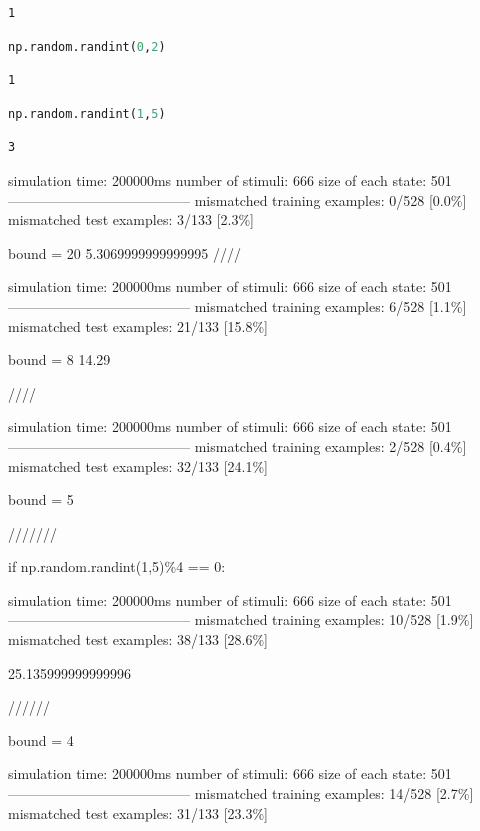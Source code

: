 \begin{lstlisting}
1
\end{lstlisting}

\begin{lstlisting}[language=Python]
np.random.randint(0,2)
\end{lstlisting}

\begin{lstlisting}
1
\end{lstlisting}

\begin{lstlisting}[language=Python]
np.random.randint(1,5)
\end{lstlisting}

\begin{lstlisting}
3
\end{lstlisting}

simulation time: 200000ms number of stimuli: 666 size of each state: 501
--------------------------------------- mismatched training examples:
0/528 {[}0.0\%{]} mismatched test examples: 3/133 {[}2.3\%{]}

bound = 20 5.3069999999999995 ////

simulation time: 200000ms number of stimuli: 666 size of each state: 501
--------------------------------------- mismatched training examples:
6/528 {[}1.1\%{]} mismatched test examples: 21/133 {[}15.8\%{]}

bound = 8 14.29

////

simulation time: 200000ms number of stimuli: 666 size of each state: 501
--------------------------------------- mismatched training examples:
2/528 {[}0.4\%{]} mismatched test examples: 32/133 {[}24.1\%{]}

bound = 5

///////

if np.random.randint(1,5)\%4 == 0:

simulation time: 200000ms number of stimuli: 666 size of each state: 501
--------------------------------------- mismatched training examples:
10/528 {[}1.9\%{]} mismatched test examples: 38/133 {[}28.6\%{]}

25.135999999999996

//////

bound = 4

simulation time: 200000ms number of stimuli: 666 size of each state: 501
--------------------------------------- mismatched training examples:
14/528 {[}2.7\%{]} mismatched test examples: 31/133 {[}23.3\%{]}

